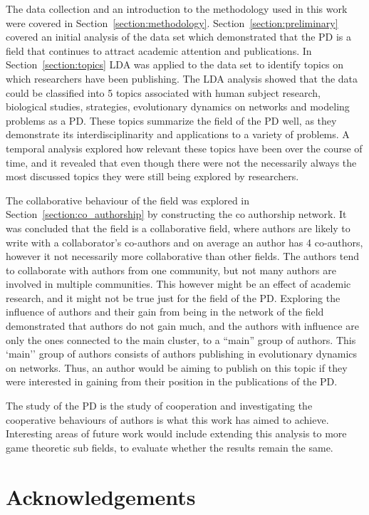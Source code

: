 \documentclass{article}
\theoremstyle{definition}
\begin{document}
The data collection and an introduction to the methodology used in this work
were covered in Section~\ref{section:methodology}.
Section~\ref{section:preliminary} covered an initial analysis of the data set
which demonstrated that the PD is a field that continues to attract academic
attention and publications. In Section~\ref{section:topics} LDA was
applied to the data set to identify topics on which researchers have been
publishing. The LDA analysis showed that the data could be classified into 5
topics associated with human subject research, biological studies, strategies,
evolutionary dynamics on networks and modeling
problems as a PD. These topics summarize the field of the PD well, as they
demonstrate its interdisciplinarity and applications to a variety of problems. A
temporal analysis explored how relevant these topics have been over the course
of time, and it revealed that even though there were not the necessarily always
the most discussed topics they were still being explored by researchers.

The collaborative behaviour of the field was explored in
Section~\ref{section:co_authorship} by constructing the co authorship network.
It was concluded that the field is a collaborative field, where authors are
likely to write with a collaborator's co-authors and on average an author has 4
co-authors, however it not necessarily more collaborative than other fields. The
authors tend to collaborate with authors from one community, but not many
authors are involved in multiple communities. This however
might be an effect of academic research, and it might not be true just for the
field of the PD. Exploring the influence of authors and their gain from being in
the network of the field demonstrated that authors do not gain much, and the
authors with influence are only the ones connected to the main cluster, to a
``main'' group of authors. This `main'' group of authors consists of authors
publishing in evolutionary dynamics on networks. Thus, an author would be aiming
to publish on this topic if they were interested in gaining from their position
in the publications of the PD.

The study of the PD is the study of cooperation and investigating
the cooperative behaviours of authors is what this work has aimed to achieve.
Interesting areas of future work would include extending this analysis to more
game theoretic sub fields, to evaluate whether the results remain the same.

\section{Acknowledgements}
\end{document}

